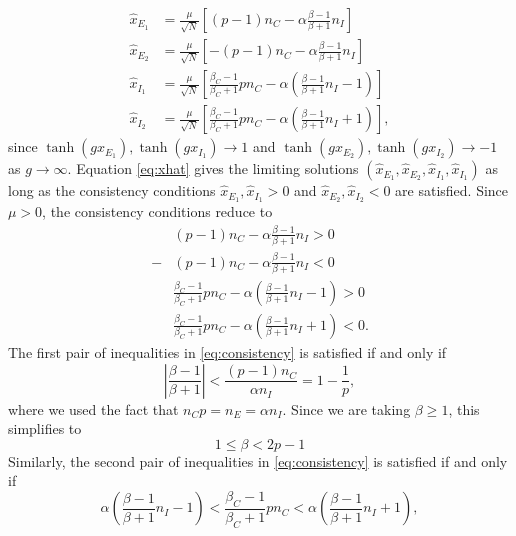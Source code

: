 \documentclass[reqno]{siamonline190516}
\begin{document}
\begin{equation}\label{eq:xhat}
    \begin{aligned}
        \hat{x}_{E_1} &= \frac{\mu}{\sqrt{N}}\left[ (p-1)n_C - \alpha \frac{\beta-1}{\beta+1}n_I \right] \\
        \hat{x}_{E_2} &= \frac{\mu}{\sqrt{N}}\left[ -(p-1)n_C - \alpha \frac{\beta-1}{\beta+1}n_I \right] \\
        \hat{x}_{I_1} &= \frac{\mu}{\sqrt{N}}\left[  \frac{\beta_C-1}{\beta_C+1} p n_C - \alpha \left( \frac{\beta-1}{\beta+1}n_I - 1 \right) \right] \\
        \hat{x}_{I_2} &= \frac{\mu}{\sqrt{N}}\left[  \frac{\beta_C-1}{\beta_C+1} p n_C - \alpha \left( \frac{\beta-1}{\beta+1}n_I + 1 \right) \right],
    \end{aligned}
\end{equation}
since $\tanh(g x_{E_1}), \tanh(g x_{I_1}) \rightarrow 1$ and $\tanh(g x_{E_2}), \tanh(g x_{I_2}) \rightarrow -1$ as $g \rightarrow \infty$. Equation \cref{eq:xhat} gives the limiting solutions $(\hat{x}_{E_1}, \hat{x}_{E_2}, \hat{x}_{I_1}, \hat{x}_{I_1})$ as long as the consistency conditions $\hat{x}_{E_1}, \hat{x}_{I_1} > 0$ and $\hat{x}_{E_2}, \hat{x}_{I_2} < 0$ are satisfied. Since $\mu > 0$, the consistency conditions reduce to
\begin{equation}\label{eq:consistency}
    \begin{aligned}
        &(p-1)n_C - \alpha \frac{\beta-1}{\beta+1}n_I > 0 \\
        -&(p-1)n_C - \alpha \frac{\beta-1}{\beta+1}n_I < 0 \\
        &\frac{\beta_C-1}{\beta_C+1} p n_C - \alpha \left( \frac{\beta-1}{\beta+1}n_I - 1 \right) > 0 \\
        &\frac{\beta_C-1}{\beta_C+1} p n_C - \alpha \left( \frac{\beta-1}{\beta+1}n_I + 1 \right) < 0.
    \end{aligned}
\end{equation}
The first pair of inequalities in \cref{eq:consistency} is satisfied if and only if
\[
    \left| \frac{\beta-1}{\beta+1} \right| < \frac{(p-1)n_C}{\alpha n_I} = 1 - \frac{1}{p},
\]
where we used the fact that $n_C p = n_E = \alpha n_I$. Since we are taking $\beta \geq 1$, this simplifies to 
\begin{equation}\label{eq:betacond}
    1 \leq \beta < 2p-1
\end{equation}
Similarly, the second pair of inequalities in \cref{eq:consistency} is satisfied if and only if 
\[
    \alpha \left( \frac{\beta-1}{\beta+1}n_I - 1 \right) < \frac{\beta_C-1}{\beta_C+1} p n_C < \alpha \left( \frac{\beta-1}{\beta+1}n_I + 1 \right),
\]
\end{document}
